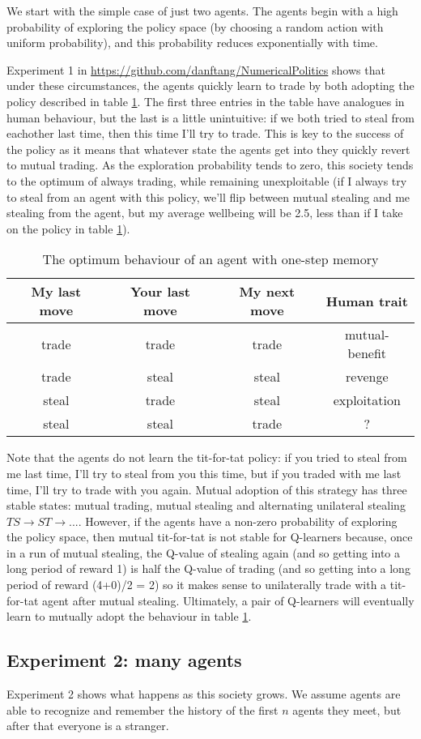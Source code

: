 \documentclass[a4paper]{report}
\begin{document}
We start with the simple case of just two agents. The agents begin with a high probability of exploring the policy space (by choosing a random action with uniform probability), and this probability reduces exponentially with time.

Experiment 1 in \url{https://github.com/danftang/NumericalPolitics} shows that under these circumstances, the agents quickly learn to trade by both adopting the policy described in table \ref{optimalpolicy1}. The first three entries in the table have analogues in human behaviour, but the last is a little unintuitive: if we both tried to steal from eachother last time, then this time I'll try to trade. This is key to the success of the policy as it means that whatever state the agents get into they quickly revert to mutual trading. As the exploration probability tends to zero, this society tends to the optimum of always trading, while remaining unexploitable (if I always try to steal from an agent with this policy, we'll flip between mutual stealing and me stealing from the agent, but my average wellbeing will be 2.5, less than if I take on the policy in table \ref{optimalpolicy1}).


\begin{table}
	\begin{center}
		\begin{tabular}{cccc}
My last move & Your last move & My next move & Human trait\\
\hline
trade & trade &  trade &	 mutual-benefit \\
trade & steal &  steal &	 revenge \\
steal & trade &  steal &	 exploitation \\
steal & steal &  trade &	 ? \\
\hline
\end{tabular}
\end{center}
\caption{The optimum behaviour of an agent with one-step memory}
\label{optimalpolicy1}
\end{table}

Note that the agents do not learn the tit-for-tat policy: if you tried to steal from me last time, I'll try to steal from you this time, but if you traded with me last time, I'll try to trade with you again. Mutual adoption of this strategy has three stable states: mutual trading, mutual stealing and alternating unilateral stealing $TS \rightarrow ST \rightarrow ...$. However, if the agents have a non-zero probability of exploring the policy space, then mutual tit-for-tat is not stable for Q-learners because, once in a run of mutual stealing, the Q-value of stealing again (and so getting into a long period of reward 1) is half the Q-value of trading (and so getting into a long period of reward (4+0)/2 = 2) so it makes sense to unilaterally trade with a tit-for-tat agent after mutual stealing. Ultimately, a pair of Q-learners will eventually learn to mutually adopt the behaviour in table \ref{optimalpolicy1}.

\subsection{Experiment 2: many agents}

Experiment 2 shows what happens as this society grows. We assume agents are able to recognize and remember the history of the first $n$ agents they meet, but after that everyone is a stranger.
\end{document}
